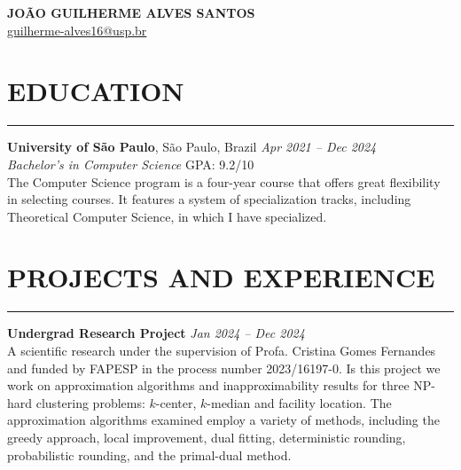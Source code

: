 \documentclass[a4paper,10pt]{article}
\begin{document}
\begin{center}
    {\LARGE \textbf{JOÃO GUILHERME ALVES SANTOS}} \\
    \vspace{0.2cm}
    \href{mailto:guilherme-alves16@usp.br}{guilherme-alves16@usp.br}

\end{center}

\section*{EDUCATION}
\vspace{-1.5em} %
\noindent\rule{\textwidth}{0.4pt} %

\noindent\textbf{University of São Paulo}, São Paulo, Brazil \hfill  \textit{Apr 2021 -- Dec 2024} \\
\textit{Bachelor's in Computer Science} \hfill GPA: 9.2/10 \\
The Computer Science program is a four-year course that offers great flexibility in selecting courses. It features a system of specialization tracks, including Theoretical Computer Science, in which I have specialized. \\


\section*{PROJECTS AND EXPERIENCE}
\vspace{-1.5em} %
\noindent\rule{\textwidth}{0.4pt} %

\noindent\textbf{Undergrad Research Project}  \hfill  \textit{Jan 2024 -- Dec 2024} \\
A scientific research under the supervision of Profa. Cristina Gomes Fernandes and funded by FAPESP in the 
process number 2023/16197-0. Is this project we work on approximation algorithms and inapproximability results for three NP-hard clustering problems: $k$-center, $k$-median and facility location. The approximation algorithms examined employ a variety of methods, including the greedy approach, local improvement, dual fitting, deterministic rounding, probabilistic rounding, and the primal-dual method.\\
\end{document}
